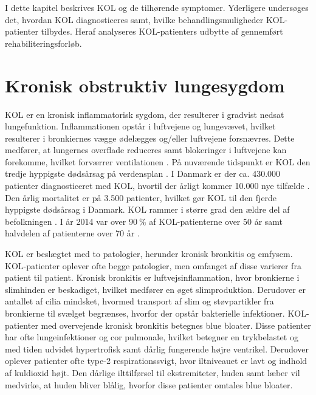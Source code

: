 I dette kapitel beskrives KOL og de tilhørende symptomer. Yderligere undersøges det, hvordan KOL diagnosticeres samt, hvilke behandlingsmuligheder KOL-patienter tilbydes. Heraf analyseres KOL-patienters udbytte af gennemført rehabiliteringsforløb.

\section{Kronisk obstruktiv lungesygdom}
KOL er en kronisk inflammatorisk sygdom, der resulterer i gradvist nedsat lungefunktion. Inflammationen opstår i luftvejene og lungevævet, hvilket resulterer i bronkiernes vægge ødelægges og/eller luftvejene forsnævres. Dette medfører, at lungernes overflade reduceres samt blokeringer i luftvejene kan forekomme, hvilket forværrer ventilationen \cite{Lungeforeningen2016}. På nuværende tidspunkt er KOL den tredje hyppigste dødsårsag på verdensplan \cite{WHO2017}. I Danmark er der ca. 430.000 patienter diagnosticeret med KOL, hvortil der årligt kommer 10.000 nye tilfælde \cite{Sygdomsbyrden2015}. Den årlig mortalitet er på 3.500 patienter, hvilket gør KOL til den fjerde hyppigste dødsårsag i Danmark. \cite{Basisbogen2016} KOL rammer i større grad den ældre del af befolkningen \cite{Kontaktforbrug2016}. I år 2014 var over $90~\%$ af KOL-patienterne over 50 år samt halvdelen af patienterne over 70 år \cite{Kontaktforbrug2016}.

KOL er beslægtet med to patologier, herunder kronisk bronkitis og emfysem. KOL-patienter oplever ofte begge patologier, men omfanget af disse varierer fra patient til patient.\cite{Basisbogen2016}
Kronisk bronkitis er luftvejsinflammation, hvor bronkierne i slimhinden er beskadiget, hvilket medfører en øget slimproduktion. Derudover er antallet af cilia mindsket, hvormed transport af slim og støvpartikler fra bronkierne til svælget begrænses, hvorfor der opstår bakterielle infektioner.\cite{Frausing2011,Britannica2016} KOL-patienter med overvejende kronisk bronkitis betegnes blue bloater. Disse patienter har ofte lungeinfektioner og cor pulmonale, hvilket betegner en trykbelastet og med tiden udvidet hypertrofisk samt dårlig fungerende højre ventrikel. Derudover oplever patienter ofte type-2 respirationssvigt, hvor iltniveauet er lavt og indhold af kuldioxid højt. Den dårlige ilttilførsel til ekstremiteter, huden samt læber vil medvirke, at huden bliver blålig, hvorfor disse patienter omtales blue bloater.\cite{Healthguidances2016}

